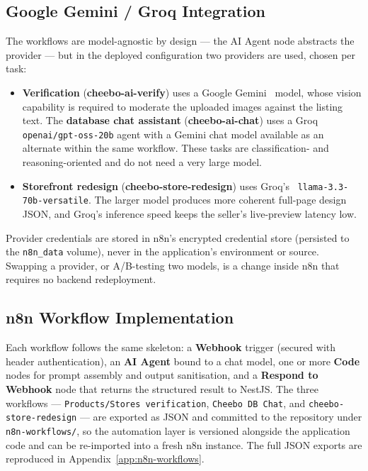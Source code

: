 \documentclass[12pt, a4paper, oneside]{report}
\begin{document}
\subsection{Google Gemini / Groq Integration}

The workflows are model-agnostic by design --- the AI Agent node
abstracts the provider --- but in the deployed configuration two
providers are used, chosen per task:

\begin{itemize}[leftmargin=*,itemsep=2pt]
  \item \textbf{Verification} (\textbf{cheebo-ai-verify}) uses a Google
        Gemini~\cite{gemini} model, whose vision capability is required to moderate the
        uploaded images against the listing text. The \textbf{database
        chat assistant} (\textbf{cheebo-ai-chat}) uses a Groq
        \texttt{openai/gpt-oss-20b} agent with a Gemini chat model
        available as an alternate within the same workflow. These tasks
        are classification- and reasoning-oriented and do not need a very
        large model.
  \item \textbf{Storefront redesign} (\textbf{cheebo-store-redesign})
        uses Groq's~\cite{groq} \texttt{llama-3.3-70b-versatile}. The larger model
        produces more coherent full-page design JSON, and Groq's
        inference speed keeps the seller's live-preview latency low.
\end{itemize}

Provider credentials are stored in n8n's encrypted credential store
(persisted to the \texttt{n8n\_data} volume), never in the
application's environment or source. Swapping a provider, or
A/B-testing two models, is a change inside n8n that requires no
backend redeployment.

\subsection{n8n Workflow Implementation}

Each workflow follows the same skeleton: a \textbf{Webhook} trigger
(secured with header authentication), an \textbf{AI Agent} bound to a
chat model, one or more \textbf{Code} nodes for prompt assembly and
output sanitisation, and a \textbf{Respond to Webhook} node that
returns the structured result to NestJS. The three workflows ---
\texttt{Products/Stores verification}, \texttt{Cheebo DB Chat}, and
\texttt{cheebo-store-redesign} --- are exported as JSON and committed
to the repository under \texttt{n8n-workflows/}, so the automation
layer is versioned alongside the application code and can be
re-imported into a fresh n8n instance. The full JSON exports are
reproduced in Appendix~\ref{app:n8n-workflows}.
\end{document}

